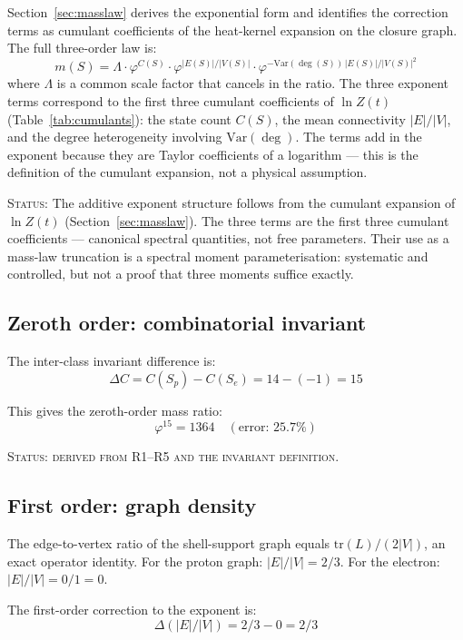 \documentclass[12pt]{article}
\newcommand{\phig}{\varphi}
\begin{document}
Section~\ref{sec:masslaw} derives the exponential form and identifies the correction terms as cumulant coefficients of the heat-kernel expansion on the closure graph. The full three-order law is:
\begin{equation}
    m(S) = \Lambda \cdot \phig^{C(S)} \cdot \phig^{|E(S)|/|V(S)|} \cdot \phig^{-\mathrm{Var}(\deg(S))\, |E(S)|/|V(S)|^2}
\end{equation}
where $\Lambda$ is a common scale factor that cancels in the ratio. The three exponent terms correspond to the first three cumulant coefficients of $\ln Z(t)$ (Table~\ref{tab:cumulants}): the state count $C(S)$, the mean connectivity $|E|/|V|$, and the degree heterogeneity involving $\mathrm{Var}(\deg)$. The terms add in the exponent because they are Taylor coefficients of a logarithm --- this is the definition of the cumulant expansion, not a physical assumption.

\textsc{Status:} The additive exponent structure follows from the cumulant expansion of $\ln Z(t)$ (Section~\ref{sec:masslaw}). The three terms are the first three cumulant coefficients --- canonical spectral quantities, not free parameters. Their use as a mass-law truncation is a spectral moment parameterisation: systematic and controlled, but not a proof that three moments suffice exactly.

\subsection{Zeroth order: combinatorial invariant}

The inter-class invariant difference is:
\begin{equation}
    \Delta C = C(S_p) - C(S_e) = 14 - (-1) = 15
\end{equation}

This gives the zeroth-order mass ratio:
\[
\phig^{15} = 1364 \quad (\text{error: } 25.7\%)
\]

\textsc{Status: derived from R1--R5 and the invariant definition.}

\subsection{First order: graph density}

The edge-to-vertex ratio of the shell-support graph equals $\mathrm{tr}(L)/(2|V|)$, an exact operator identity. For the proton graph: $|E|/|V| = 2/3$. For the electron: $|E|/|V| = 0/1 = 0$.

The first-order correction to the exponent is:
\begin{equation}
    \Delta(|E|/|V|) = 2/3 - 0 = 2/3
\end{equation}
\end{document}
